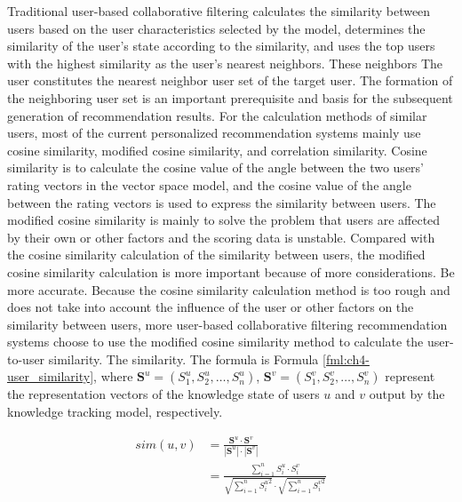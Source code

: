Traditional user-based collaborative filtering calculates the similarity between users based on the user characteristics selected by the model, determines the similarity of the user's state according to the similarity, and uses the top users with the highest similarity as the user's nearest neighbors. These neighbors The user constitutes the nearest neighbor user set of the target user. The formation of the neighboring user set is an important prerequisite and basis for the subsequent generation of recommendation results. For the calculation methods of similar users, most of the current personalized recommendation systems mainly use cosine similarity, modified cosine similarity, and correlation similarity. Cosine similarity is to calculate the cosine value of the angle between the two users' rating vectors in the vector space model, and the cosine value of the angle between the rating vectors is used to express the similarity between users. The modified cosine similarity is mainly to solve the problem that users are affected by their own or other factors and the scoring data is unstable. Compared with the cosine similarity calculation of the similarity between users, the modified cosine similarity calculation is more important because of more considerations. Be more accurate. Because the cosine similarity calculation method is too rough and does not take into account the influence of the user or other factors on the similarity between users, more user-based collaborative filtering recommendation systems choose to use the modified cosine similarity method to calculate the user-to-user similarity. The similarity. The formula is Formula \ref{fml:ch4-user_similarity}, where \(\mathbf{S}^u=(S^u_1,S^u_2,\ldots,S^u_n)\), \(\mathbf{S}^v=(S^v_1,S^v_2,\ldots, S^v_n)\) represent the representation vectors of the knowledge state of users \(u\) and \(v\) output by the knowledge tracking model, respectively.

\begin{equation}
  \begin{align}\label{fml:ch4-user_similarity}
    sim(u, v) & =\frac{\mathbf{S}^u \cdot \mathbf{S}^v}{|\mathbf{S}^u|\cdot |\mathbf{S}^v|}                                                                \\
              & =\frac{\sum\limits_{i = 1}^{n}{S^u_i\cdot S^v_i}}{\sqrt{\sum\limits_{i = 1}^{n}{{S^u_i}^2}}\cdot\sqrt{\sum\limits_{i = 1}^{n}{{S^v_i}^2}}}
  \end{align}
\end{equation}

